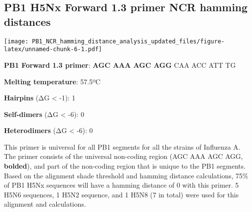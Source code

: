 \documentclass[
]{article}
\newenvironment{Shaded}{\begin{snugshade}}{\end{snugshade}}
\newcommand{\AttributeTok}[1]{\textcolor[rgb]{0.77,0.63,0.00}{#1}}
\newcommand{\DecValTok}[1]{\textcolor[rgb]{0.00,0.00,0.81}{#1}}
\newcommand{\FunctionTok}[1]{\textcolor[rgb]{0.00,0.00,0.00}{#1}}
\newcommand{\NormalTok}[1]{#1}
\newcommand{\OtherTok}[1]{\textcolor[rgb]{0.56,0.35,0.01}{#1}}
\newcommand{\SpecialCharTok}[1]{\textcolor[rgb]{0.00,0.00,0.00}{#1}}
\newcommand{\StringTok}[1]{\textcolor[rgb]{0.31,0.60,0.02}{#1}}
\begin{document}
\hypertarget{pb1-h5nx-forward-1.3-primer-ncr-hamming-distances}{%
\subsection{PB1 H5Nx Forward 1.3 primer NCR hamming
distances}\label{pb1-h5nx-forward-1.3-primer-ncr-hamming-distances}}

\begin{Shaded}
\end{Shaded}

\texttt{[image: PB1\_NCR\_hamming\_distance\_analysis\_updated\_files/figure-latex/unnamed-chunk-6-1.pdf]}

\textbf{PB1 Forward 1.3 primer}: \textbf{AGC AAA AGC AGG} CAA ACC ATT TG

\textbf{Melting temperature}: 57.5ºC

\textbf{Hairpins} (ΔG \textless{} -1): 1

\textbf{Self-dimers} (ΔG \textless{} -6): 0

\textbf{Heterodimers} (ΔG \textless{} -6): 0

This primer is universal for all PB1 segments for all the strains of
Influenza A. The primer consists of the universal non-coding region (AGC
AAA AGC AGG, \textbf{bolded}), and part of the non-coding region that is
unique to the PB1 segments. Based on the alignment shade threshold and
hamming distance calculations, 75\% of PB1 H5Nx sequences will have a
hamming distance of 0 with this primer. 5 H5N6 sequences, 1 H5N2
sequence, and 1 H5N8 (7 in total) were used for this alignment and
calculations.
\end{document}
